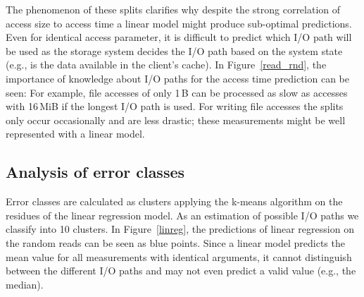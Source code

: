 \documentclass{superfri}
\begin{document}
	The phenomenon of these splits clarifies why despite the strong correlation of access size to access time a linear model might produce sub-optimal predictions. 
	Even for identical access parameter, it is difficult to predict which I/O path will be used as the storage system decides the I/O path based on the system state (e.g., is the data available in the client's cache).
	In Figure~\ref{read_rnd}, the importance of knowledge about I/O paths for the  access time prediction can be seen: For example, file accesses of only 1\,B can be processed as slow as accesses with 16\,MiB if the longest I/O path is used.
	For writing file accesses the splits only occur occasionally and are less drastic; these measurements might be well represented with a linear model.
	
	\subsection{Analysis of error classes}
	Error classes are calculated as clusters applying the k-means algorithm on the residues of the linear regression model.
	As an estimation of possible I/O paths we classify into 10 clusters.
	In Figure~\ref{linreg}, the predictions of linear regression on the random reads can be seen as blue points.
	Since a linear model predicts the mean value for all measurements with identical arguments, it cannot distinguish between the different I/O paths and may not even predict a valid value (e.g., the median).
	
\end{document}
